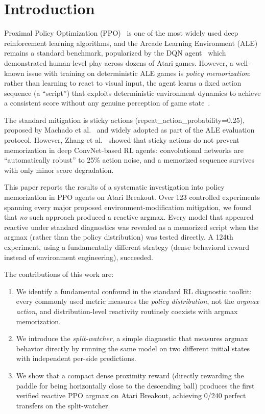 \documentclass[11pt]{article}
\begin{document}
\section{Introduction}

Proximal Policy Optimization (PPO)~\cite{schulman2017ppo} is one of the most
widely used deep reinforcement learning algorithms, and the Arcade Learning
Environment (ALE)~\cite{bellemare2013ale} remains a standard benchmark, popularized
by the DQN agent~\cite{mnih2015human} which demonstrated human-level play across
dozens of Atari games. However,
a well-known issue with training on deterministic ALE games is \emph{policy
memorization}: rather than learning to react to visual input, the agent learns
a fixed action sequence (a ``script'') that exploits deterministic environment
dynamics to achieve a consistent score without any genuine perception of game
state~\cite{machado2018revisiting,zhang2018overfitting}.

The standard mitigation is sticky actions (repeat\_action\_probability=0.25),
proposed by Machado et al.~\cite{machado2018revisiting} and widely adopted as
part of the ALE evaluation protocol. However, Zhang et al.~\cite{zhang2018overfitting}
showed that sticky actions do not prevent memorization in deep ConvNet-based RL
agents: convolutional networks are ``automatically robust'' to 25\% action noise,
and a memorized sequence survives with only minor score degradation.

This paper reports the results of a systematic investigation into policy
memorization in PPO agents on Atari Breakout. Over 123 controlled experiments
spanning every major proposed environment-modification mitigation, we found that
\emph{no} such approach produced a reactive argmax. Every model
that appeared reactive under standard diagnostics was revealed as a memorized
script when the argmax (rather than the policy distribution) was tested
directly. A 124th experiment, using a fundamentally different strategy (dense
behavioral reward instead of environment engineering), succeeded.

The contributions of this work are:
\begin{enumerate}
    \item We identify a fundamental confound in the standard RL diagnostic
    toolkit: every commonly used metric measures the \emph{policy distribution},
    not the \emph{argmax action}, and distribution-level reactivity routinely
    coexists with argmax memorization.
    \item We introduce the \emph{split-watcher}, a simple diagnostic that
    measures argmax behavior directly by running the same model on two
    different initial states with independent per-side predictions.
    \item We show that a compact dense proximity reward (directly rewarding
    the paddle for being horizontally close to the descending ball) produces
    the first verified reactive PPO argmax on Atari Breakout, achieving
    0/240 perfect transfers on the split-watcher.
\end{enumerate}
\end{document}
